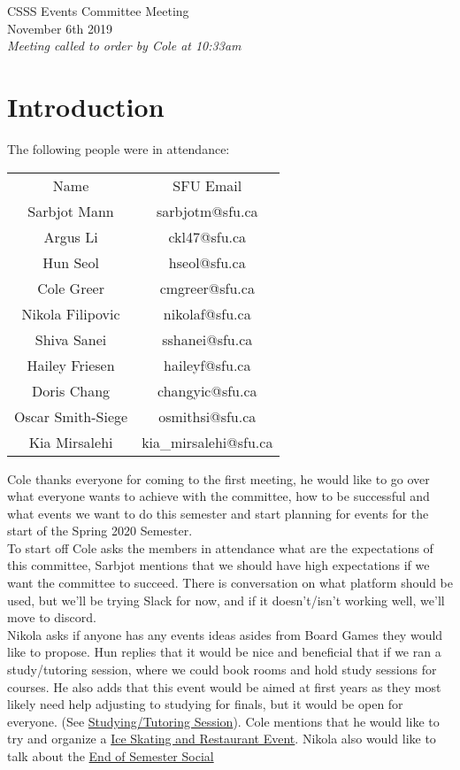 \documentclass[12pt]{article}
\begin{document}
\begin{center}
CSSS Events Committee Meeting \\
November 6th 2019 \\
\em Meeting called to order by Cole at 10:33am
\end{center}
\tableofcontents
\thispagestyle{empty}
\clearpage
{} 
\section{Introduction} \label{sec:Introduction}

The following people were in attendance: 
\begin{table}[h!]
\centering
\begin{tabular}{cc}
Name              & SFU Email        \\
Sarbjot Mann      & sarbjotm@sfu.ca \\
Argus Li          & ckl47@sfu.ca    \\
Hun Seol          & hseol@sfu.ca    \\
Cole Greer        & cmgreer@sfu.ca  \\
Nikola Filipovic  & nikolaf@sfu.ca  \\
Shiva Sanei       & sshanei@sfu.ca  \\
Hailey Friesen    & haileyf@sfu.ca  \\
Doris Chang       & changyic@sfu.ca \\
Oscar Smith-Siege & osmithsi@sfu.ca \\
Kia Mirsalehi     & kia\_mirsalehi@sfu.ca 
\end{tabular}
\end{table}

\noindent Cole thanks everyone for coming to the first meeting, he would like to go over what everyone wants to achieve with the committee, how to be successful and what events we want to do this semester and start planning for events for the start of the Spring 2020 Semester. \\

\noindent To start off Cole asks the members in attendance what are the expectations of this committee, Sarbjot mentions that we should have high expectations if we want the committee to succeed. There is conversation on what platform should be used, but we'll be trying Slack for now, and if it doesn't/isn't working well, we'll move to discord. \\

\noindent Nikola asks if anyone has any events ideas asides from Board Games they would like to propose. Hun replies that it would be nice and beneficial that if we ran a study/tutoring session, where we could book rooms and hold study sessions for courses. He also adds that this event would be aimed at first years as they most likely need help adjusting to studying for finals, but it would be open for everyone. (See \hyperref[sec:Tutor]{Studying/Tutoring Session}). Cole mentions that he would like to try and organize a \hyperref[sec:Skate]{Ice Skating and Restaurant Event}. Nikola also would like to talk about the \hyperref[sec:EoSS]{End of Semester Social}
\end{document}
